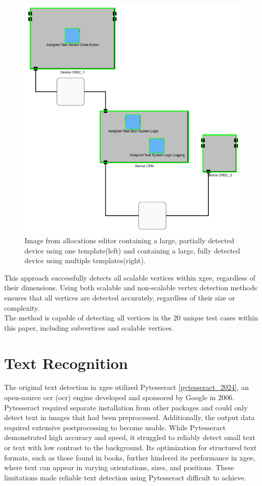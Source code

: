 \begin{figure}[htb]
\begin{minipage}[b]{0.36\textwidth}
        \includegraphics[width=\textwidth]{pictures/many_templates_after.png}
    \end{minipage}
    \caption{Image from allocations editor containing a large, partially detected device using one template(left) and containing a large, fully detected device using multiple templates(right).}
    \label{fig:many_templates}
\end{figure}
This approach successfully detects all scalable vertices within \acrshort{xgee}, regardless of their dimensions. Using both scalable and non-scalable vertex detection methods ensures that all vertices are detected accurately, regardless of their size or complexity.\\
The method is capable of detecting all vertices in the 20 unique test cases within this paper, including subvertices and scalable vertices.

\section{Text Recognition}
\label{sec:text_recognition}
The original text detection in \acrshort{xgee} utilized Pytesseract \ref{pytesseract_2024}, an open-source \acrlong{ocr} (\acrshort{ocr}) engine developed and sponsored by Google in 2006. Pytesseract required separate installation from other packages and could only detect text in images that had been preprocessed. Additionally, the output data required extensive postprocessing to become usable. While Pytesseract demonstrated high accuracy and speed, it struggled to reliably detect small text or text with low contrast to the background. Its optimization for structured text formats, such as those found in books, further hindered its performance in \acrshort{xgee}, where text can appear in varying orientations, sizes, and positions. These limitations made reliable text detection using Pytesseract difficult to achieve.

